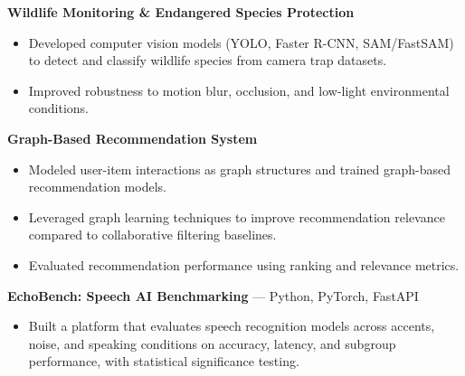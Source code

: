 \documentclass[a4paper,8pt]{extarticle}
\begin{document}
\noindent
\textbf{Wildlife Monitoring \& Endangered Species Protection}

\begin{itemize}
\item Developed computer vision models (YOLO, Faster R-CNN, SAM/FastSAM) to detect and classify wildlife species from camera trap datasets.
\item Improved robustness to motion blur, occlusion, and low-light environmental conditions.
\end{itemize}

\noindent
\textbf{Graph-Based Recommendation System}

\begin{itemize}
\item Modeled user-item interactions as graph structures and trained graph-based recommendation models.
\item Leveraged graph learning techniques to improve recommendation relevance compared to collaborative filtering baselines.
\item Evaluated recommendation performance using ranking and relevance metrics.
\end{itemize}

\noindent
\textbf{EchoBench: Speech AI Benchmarking} --- Python, PyTorch, FastAPI

\begin{itemize}
\item Built a platform that evaluates speech recognition models across accents, noise, and speaking conditions on accuracy, latency, and subgroup performance, with statistical significance testing.
\end{itemize}
\end{document}
